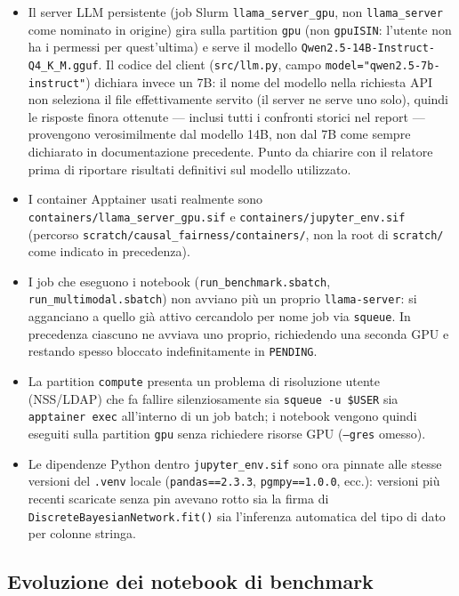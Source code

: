 \begin{itemize}
  \item Il server LLM persistente (job Slurm \texttt{llama\_server\_gpu}, non \texttt{llama\_server} come nominato in origine) gira sulla partition \texttt{gpu} (non \texttt{gpuISIN}: l'utente non ha i permessi per quest'ultima) e serve il modello \texttt{Qwen2.5-14B-Instruct-Q4\_K\_M.gguf}. Il codice del client (\texttt{src/llm.py}, campo \texttt{model="qwen2.5-7b-instruct"}) dichiara invece un 7B: il nome del modello nella richiesta API non seleziona il file effettivamente servito (il server ne serve uno solo), quindi le risposte finora ottenute --- inclusi tutti i confronti storici nel report --- provengono verosimilmente dal modello 14B, non dal 7B come sempre dichiarato in documentazione precedente. Punto da chiarire con il relatore prima di riportare risultati definitivi sul modello utilizzato.
  \item I container Apptainer usati realmente sono \texttt{containers/llama\_server\_gpu.sif} e \texttt{containers/jupyter\_env.sif} (percorso \texttt{scratch/causal\_fairness/containers/}, non la root di \texttt{scratch/} come indicato in precedenza).
  \item I job che eseguono i notebook (\texttt{run\_benchmark.sbatch}, \texttt{run\_multimodal.sbatch}) non avviano pi\`u un proprio \texttt{llama-server}: si agganciano a quello gi\`a attivo cercandolo per nome job via \texttt{squeue}. In precedenza ciascuno ne avviava uno proprio, richiedendo una seconda GPU e restando spesso bloccato indefinitamente in \texttt{PENDING}.
  \item La partition \texttt{compute} presenta un problema di risoluzione utente (NSS/LDAP) che fa fallire silenziosamente sia \texttt{squeue -u \$USER} sia \texttt{apptainer exec} all'interno di un job batch; i notebook vengono quindi eseguiti sulla partition \texttt{gpu} senza richiedere risorse GPU (\texttt{--gres} omesso).
  \item Le dipendenze Python dentro \texttt{jupyter\_env.sif} sono ora pinnate alle stesse versioni del \texttt{.venv} locale (\texttt{pandas==2.3.3}, \texttt{pgmpy==1.0.0}, ecc.): versioni pi\`u recenti scaricate senza pin avevano rotto sia la firma di \texttt{DiscreteBayesianNetwork.fit()} sia l'inferenza automatica del tipo di dato per colonne stringa.
\end{itemize}

\subsection{Evoluzione dei notebook di benchmark}

